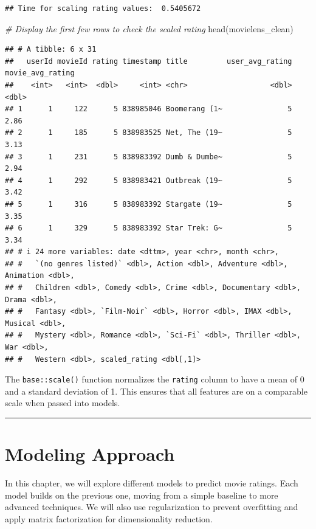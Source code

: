 \documentclass[
]{article}
\newenvironment{Shaded}{}{}
\newcommand{\CommentTok}[1]{\textcolor[rgb]{0.38,0.63,0.69}{\textit{#1}}}
\newcommand{\FunctionTok}[1]{\textcolor[rgb]{0.02,0.16,0.49}{#1}}
\newcommand{\NormalTok}[1]{#1}
\begin{document}
\begin{verbatim}
## Time for scaling rating values:  0.5405672
\end{verbatim}

\begin{Shaded}
\begin{Highlighting}[]
\CommentTok{\# Display the first few rows to check the scaled rating}
\FunctionTok{head}\NormalTok{(movielens\_clean)}
\end{Highlighting}
\end{Shaded}

\begin{verbatim}
## # A tibble: 6 x 31
##   userId movieId rating timestamp title         user_avg_rating movie_avg_rating
##    <int>   <int>  <dbl>     <int> <chr>                   <dbl>            <dbl>
## 1      1     122      5 838985046 Boomerang (1~               5             2.86
## 2      1     185      5 838983525 Net, The (19~               5             3.13
## 3      1     231      5 838983392 Dumb & Dumbe~               5             2.94
## 4      1     292      5 838983421 Outbreak (19~               5             3.42
## 5      1     316      5 838983392 Stargate (19~               5             3.35
## 6      1     329      5 838983392 Star Trek: G~               5             3.34
## # i 24 more variables: date <dttm>, year <chr>, month <chr>,
## #   `(no genres listed)` <dbl>, Action <dbl>, Adventure <dbl>, Animation <dbl>,
## #   Children <dbl>, Comedy <dbl>, Crime <dbl>, Documentary <dbl>, Drama <dbl>,
## #   Fantasy <dbl>, `Film-Noir` <dbl>, Horror <dbl>, IMAX <dbl>, Musical <dbl>,
## #   Mystery <dbl>, Romance <dbl>, `Sci-Fi` <dbl>, Thriller <dbl>, War <dbl>,
## #   Western <dbl>, scaled_rating <dbl[,1]>
\end{verbatim}

The \texttt{base::scale()} function normalizes the \texttt{rating}
column to have a mean of 0 and a standard deviation of 1. This ensures
that all features are on a comparable scale when passed into models.

\begin{center}\rule{0.5\linewidth}{0.5pt}\end{center}

\section{Modeling Approach}\label{modeling-approach}

In this chapter, we will explore different models to predict movie
ratings. Each model builds on the previous one, moving from a simple
baseline to more advanced techniques. We will also use regularization to
prevent overfitting and apply matrix factorization for dimensionality
reduction.
\end{document}
